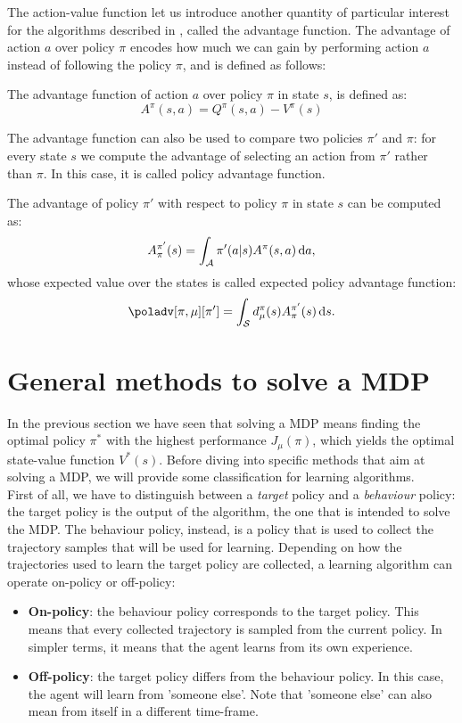 The action-value function let us introduce another quantity of particular interest for the algorithms described in , called the advantage function. The advantage of action $a$ over policy $\pi$ encodes how much we can gain by performing action $a$ instead of following the policy $\pi$, and is defined as follows:
\begin{definition}
The advantage function of action $a$ over policy $\pi$ in state $s$, is defined as:
\[
A^{\pi}(s,a) = Q^{\pi}(s,a) - V^{\pi}(s)
\]
\end{definition}

The advantage function can also be used to compare two policies $\pi'$ and $\pi$: for every state $s$ we compute the advantage of selecting an action from $\pi'$ rather than $\pi$. In this case, it is called policy advantage function.
\begin{definition}
The advantage of policy $\pi'$ with respect to policy $\pi$ in state $s$ can be computed as:
\[
A_\pi^{\pi'}(s) = \int_{\mathcal{A}} \pi'(a|s)A^\pi(s, a) \, \textrm{d} a,
\]
whose expected value over the states is called expected policy advantage function:
\[
\poladv[\pi,\mu][\pi'] = \int_{\sspace} d_\mu^{\pi}(s)A_\pi^{\pi'}(s) \de s.
\]
\end{definition}


\section{General methods to solve a MDP}
\label{sec:solve-mdp}

In the previous section we have seen that solving a MDP means finding the optimal policy $\pi^*$ with the highest performance $J_\mu(\pi)$, which yields the optimal state-value function $V^*(s)$. Before diving into specific methods that aim at solving a MDP, we will provide some classification for learning algorithms.\\
First of all, we have to distinguish between a \textit{target} policy and a \textit{behaviour} policy: the target policy is the output of the algorithm, the one that is intended to solve the MDP. The behaviour policy, instead, is a policy that is used to collect the trajectory samples that will be used for learning. Depending on how the trajectories used to learn the target policy are collected, a learning algorithm can operate on-policy or off-policy:
\begin{itemize}
\item \textbf{On-policy}: the behaviour policy corresponds to the target policy. This means that every collected trajectory is sampled from the current policy. In simpler terms, it means that the agent learns from its own experience.
\item \textbf{Off-policy}: the target policy differs from the behaviour policy. In this case, the agent will learn from 'someone else'. Note that 'someone else' can also mean from itself in a different time-frame.
\end{itemize}

